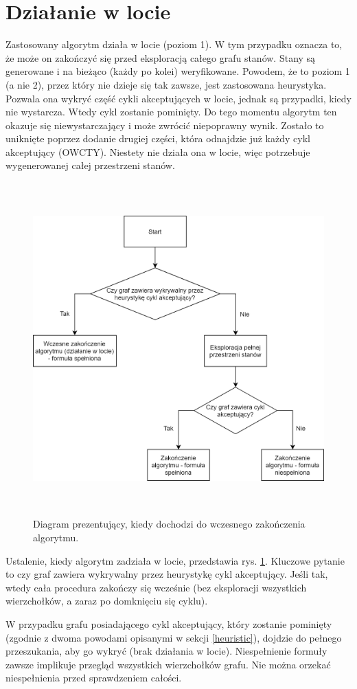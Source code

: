 \newpage
\section{Działanie w locie}

Zastosowany algorytm działa w locie (poziom 1).
W tym przypadku oznacza to, że może on zakończyć się przed eksploracją całego grafu stanów.
Stany są generowane i na bieżąco (każdy po kolei) weryfikowane.
Powodem, że to poziom 1 (a nie 2), przez który nie dzieje się tak zawsze, jest zastosowana heurystyka.
Pozwala ona wykryć część cykli akceptujących w locie, jednak są przypadki, kiedy nie wystarcza.
Wtedy cykl zostanie pominięty.
Do tego momentu algorytm ten okazuje się niewystarczający i może zwrócić niepoprawny wynik.
Zostało to uniknięte poprzez dodanie drugiej części, która odnajdzie już każdy cykl akceptujący (OWCTY).
Niestety nie działa ona w locie, więc potrzebuje wygenerowanej całej przestrzeni stanów.

\begin{figure}[h]
    \centering
    \includegraphics[height=12.8cm,keepaspectratio]{img/on-the-fly-diagram.png}
    \caption{Diagram prezentujący, kiedy dochodzi do wczesnego zakończenia algorytmu.}
    \label{fig:on_the_fly_diagram}
\end{figure}

Ustalenie, kiedy algorytm zadziała w locie, przedstawia rys. \ref{fig:on_the_fly_diagram}.
Kluczowe pytanie to czy graf zawiera wykrywalny przez heurystykę cykl akceptujący.
Jeśli tak, wtedy cała procedura zakończy się wcześnie (bez eksploracji wszystkich wierzchołków, a zaraz po domknięciu się cyklu).

W przypadku grafu posiadającego cykl akceptujący, który zostanie pominięty (zgodnie z dwoma powodami opisanymi w sekcji \ref{heuristic}), dojdzie do pełnego przeszukania, aby go wykryć (brak działania w locie).
Niespełnienie formuły zawsze implikuje przegląd wszystkich wierzchołków grafu.
Nie można orzekać niespełnienia przed sprawdzeniem całości.

